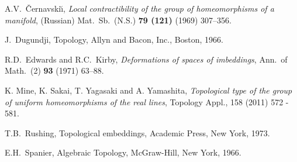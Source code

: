 \documentclass[11pt, fleqn]{amsart}
\theoremstyle{definition}
\begin{document}

\begin{thebibliography}{99}

 A.V.~{\v C}ernavski\u\i,
 {\em Local contractibility of the group of homeomorphisms of a manifold},
 (Russian) Mat.\ Sb.\ (N.S.) {\bf 79 (121)} (1969) 307--356.

J.~Dugundji, Topology, Allyn and Bacon, Inc., Boston, 1966. 

 R.D.~Edwards and R.C.~Kirby,
 {\em Deformations of spaces of imbeddings},
 Ann.\ of Math.\ (2) {\bf 93} (1971) 63--88.
 

 K. Mine, K. Sakai, T. Yagasaki and A. Yamashita, 
{\em Topological type of the group of uniform homeomorphisms of the real lines},
{Topology Appl.,} 158 (2011) 572 - 581. 

T.B.~Rushing, 
{Topological embeddings}, Academic Press, New York, 1973. 

E.H.~Spanier, 
{Algebraic Topology}, McGraw-Hill, New York, 1966. 

\end{thebibliography}

\end{document}
